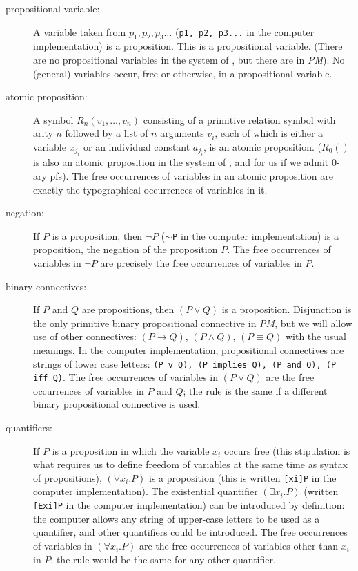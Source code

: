\documentclass{article}
\begin{document}
\begin{description}

\item[propositional variable:] A variable taken from $p_1, p_2,
p_3\ldots$ ({\tt p1, p2, p3...} in the computer implementation) is a
proposition.  This is a propositional variable.  (There are no
propositional variables in the system of \cite{types40}, but there are
in {\em PM\/}).  No (general) variables occur, free or otherwise, in a
propositional variable.

\item[atomic proposition:] A symbol $R_n(v_1,\ldots,v_n)$ consisting
of a primitive relation symbol with arity $n$ followed by a list of
$n$ arguments $v_i$, each of which is either a variable $x_{j_i}$ or
an individual constant $a_{j_i}$, is an atomic proposition.  ($R_0()$
is also an atomic proposition in the system of \cite{types40}, and for
us if we admit 0-ary pfs).  The free occurrences of variables in an
atomic proposition are exactly the typographical occurrences of
variables in it.

\item[negation:]  
If $P$ is a proposition, then $\neg P$ ({\tt $\sim$P} in the computer
implementation) is a proposition, the negation of the proposition $P$.
The free occurrences of variables in $\neg P$ are precisely the free
occurrences of variables in $P$.

\item[binary connectives:] If $P$ and $Q$ are
propositions, then $(P \vee Q)$ is a proposition.  Disjunction is the
only primitive binary propositional connective in {\em PM\/}, but we
will allow use of other connectives: $(P \rightarrow Q)$, $(P \wedge
Q)$, $(P \equiv Q)$ with the usual meanings.  In the computer
implementation, propositional connectives are strings of lower case
letters: {\tt (P v Q), (P implies Q), (P and Q), (P iff Q)}.  The free
occurrences of variables in $(P \vee Q)$ are the free occurrences of
variables in $P$ and $Q$; the rule is the same if a different binary
propositional connective is used.

\item[quantifiers:] If $P$ is a proposition in which the variable
$x_i$ occurs free (this stipulation is what requires us to define
freedom of variables at the same time as syntax of propositions),
$(\forall x_i.P)$ is a proposition (this is written {\tt [xi]P} in the
computer implementation).  The existential quantifier $(\exists
x_i.P)$ (written {\tt [Exi]P} in the computer implementation) can be
introduced by definition: the computer allows any string of upper-case
letters to be used as a quantifier, and other quantifiers could be
introduced.  The free occurrences of variables in $(\forall x_i.P)$
are the free occurrences of variables other than $x_i$ in $P$; the
rule would be the same for any other quantifier.


\end{description}
\end{document}
